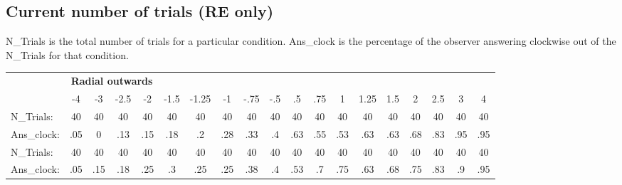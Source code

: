 \documentclass[11pt]{article} %
\begin{document}
\subsection{Current number of trials (RE only)}
N\_Trials is the total number of trials for a particular condition.
Ans\_clock is the percentage of the observer answering clockwise out of the N\_Trials for that condition.
\begin{table}[htb]
  \label{tbl:stats-and-correlations}
  \small\begin{tabular*}{\linewidth}{l@{\extracolsep{\fill}}*{18}{c}}
    \toprule
    & \multicolumn{4}{c}{\textbf{Radial outwards}}\\ \cmidrule(r){2-18}
    & {-4} & {-3} & {-2.5} & {-2} & {-1.5} & {-1.25} & {-1} & {-.75} & {-.5} & {.5} & {.75} & {1} & {1.25} & {1.5} & {2} & {2.5}& {3}& {4} \\ [0.5ex]
    N\_Trials:  &    40 &    40 &    40 &    40 &    40 &    40 &    40&   40 &   40 &    40&    40&    40&   40&    40&    40 & 40 & 40 & 40\\
    Ans\_clock:  &  .05 &  0 &    .13 &    .15 &    .18 &    .2 &    .28 &   .33 &    .4&    .63&    .55&    .53&    .63&    .63&    .68&    .83 & .95 & .95\\
    N\_Trials:  &    40 &    40 &    40 &    40 &    40 &    40 &    40&   40 &   40 &    40&    40&    40&   40&    40&    40 & 40 & 40 & 40\\
    Ans\_clock:  &  .05 &  .15 &    .18 &   .25 &    .3 &    .25 &   .25 &    .38&    .4&    .53&    .7&    .75&    .63&    .68&    .75 & .83 & .9 & .95\\
    \bottomrule
  \end{tabular*}
\end{table}
\end{document}
